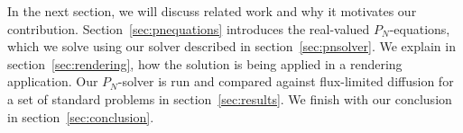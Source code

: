 In the next section, we will discuss related work and why it motivates our contribution. Section~\ref{sec:pnequations} introduces the real-valued $P_N$-equations, which we solve using our solver described in section~\ref{sec:pnsolver}. We explain in section~\ref{sec:rendering}, how the solution is being applied in a rendering application. Our $P_N$-solver is run and compared against flux-limited diffusion for a set of standard problems in section~\ref{sec:results}. We finish with our conclusion in section~\ref{sec:conclusion}.